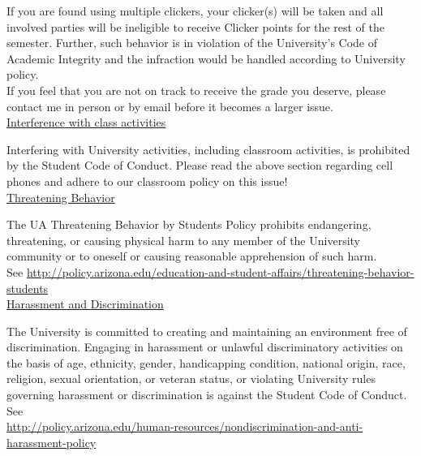 \documentclass[11pt]{article}
\begin{document}
\hangindent=5cm 
If you are found using multiple clickers, your clicker(s) will be taken and all involved parties will be ineligible to receive Clicker points for the rest of the semester.
Further, such behavior is in violation of the University's Code of Academic Integrity and the infraction would be handled according to University policy. \\

\hangindent=5cm 
If you feel that you are not on track to receive the grade you deserve, please contact me in person or by email before it becomes a larger issue.\\

\hangindent=5cm 
\underline{Interference with class activities}

\hangindent=5cm 
Interfering with University activities, including classroom activities, is prohibited by the Student Code of Conduct.  
Please read the above section regarding cell phones and adhere to our classroom policy on this issue!\\

\hangindent=5cm 
\underline{Threatening Behavior}

\hangindent=5cm 
The UA Threatening Behavior by Students Policy prohibits endangering, threatening, or causing physical harm to any member of the University community or to oneself or causing reasonable apprehension of such harm. \\
See \href{http://policy.arizona.edu/education-and-student-affairs/threatening-behavior-students}{http://policy.arizona.edu/education-and-student-affairs/threatening-behavior-students}\\

\hangindent=5cm 
\underline{Harassment and Discrimination}

\hangindent=5cm 
The University is committed to creating and maintaining an environment free of discrimination.  Engaging in harassment or unlawful discriminatory activities on the basis of age, ethnicity, gender, handicapping condition, national origin, race, religion, sexual orientation, or veteran status, or violating University rules governing harassment or discrimination is against the Student Code of Conduct.  See\\ \href{http://policy.arizona.edu/human-resources/nondiscrimination-and-anti-harassment-policy}{http://policy.arizona.edu/human-resources/nondiscrimination-and-anti-harassment-policy}
\end{document}
